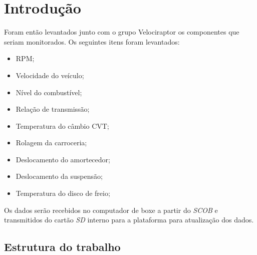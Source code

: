 \chapter{Introdução} 
	\label{ch:introducao}
Foram então levantados junto com o grupo Velociraptor os componentes que seriam monitorados. Os seguintes itens foram levantados: 
\begin{itemize}
	\item RPM;
	\item Velocidade do veículo;
	\item Nível do combustível;
	\item Relação de transmissão;
	\item Temperatura do câmbio CVT;
	\item Rolagem da carroceria;
	\item Deslocamento do amortecedor;
	\item Deslocamento da suspensão;
	\item Temperatura do disco de freio;
\end{itemize}
\newpage

Os dados serão recebidos no computador de boxe a partir do \textit{SCOB} e transmitidos do cartão \textit{SD} interno para a plataforma para atualização dos dados.  

\section{Estrutura do trabalho}